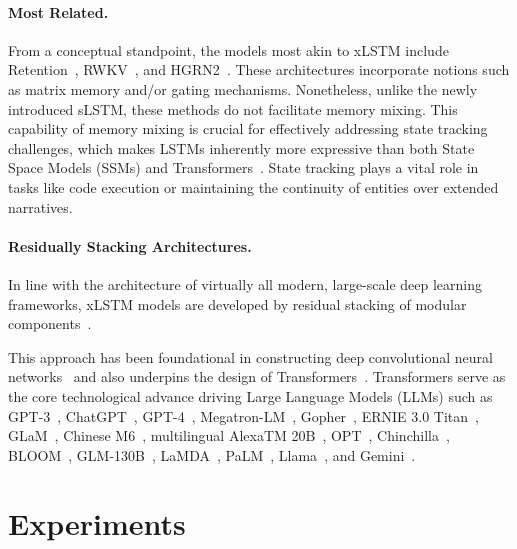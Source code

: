 \paragraph{Most Related.} From a conceptual standpoint, the models most akin to xLSTM include Retention~\citep{Sun:23arxiv}, RWKV~\citep{Peng:23arxivshort,Peng:24arxivshort}, and HGRN2~\citep{Qin:24arxiv}. These architectures incorporate notions such as matrix memory and/or gating mechanisms. Nonetheless, unlike the newly introduced sLSTM, these methods do not facilitate memory mixing. This capability of memory mixing is crucial for effectively addressing state tracking challenges, which makes LSTMs inherently more expressive than both State Space Models (SSMs) and Transformers~\citep{Merrill:24,Deletang:23}. State tracking plays a vital role in tasks like code execution or maintaining the continuity of entities over extended narratives.

\paragraph{Residually Stacking Architectures.} In line with the architecture of virtually all modern, large-scale deep learning frameworks, xLSTM models are developed by residual stacking of modular components~\citep{Srivastava:15,He:16}.

This approach has been foundational in constructing deep convolutional neural networks~\citep{He:16} and also underpins the design of Transformers~\citep{Vaswani:17}. Transformers serve as the core technological advance driving Large Language Models (LLMs) such as GPT-3~\citep{Brown:20short}, ChatGPT~\citep{Schulman:22short}, GPT-4~\citep{Achiam:23gpt4short}, Megatron-LM~\citep{Shoeybi:19}, Gopher~\citep{Rae:21short}, ERNIE 3.0 Titan~\citep{Wang:21arxivshort}, GLaM~\citep{Du:21glamshort}, Chinese M6~\citep{Lin:21}, multilingual AlexaTM 20B~\citep{Soltan:22}, OPT~\citep{Zhang:22opt}, Chinchilla~\citep{Hoffmann:22short}, BLOOM~\citep{Scao:22arxivshort}, GLM-130B~\citep{Zeng:22arxivshort}, LaMDA~\citep{Thoppilan:22short}, PaLM~\citep{Chowdhery:22short}, Llama~\citep{Touvron:23arxiv}, and Gemini~\citep{GeminiTeam:23arxiv,Reid:24arxiv}.

\section{Experiments}
\label{sec:Exp}

